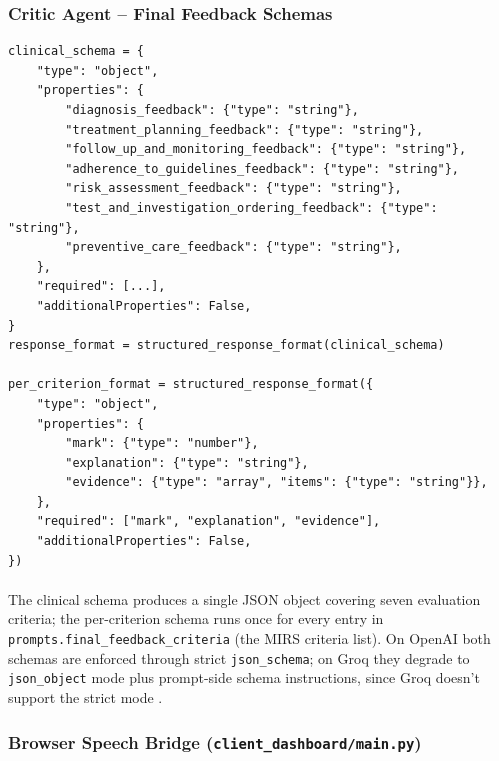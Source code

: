 \documentclass{article}
\begin{document}
\subsubsection{Critic Agent -- Final Feedback Schemas}

\begin{lstlisting}[style=codeblock]
clinical_schema = {
    "type": "object",
    "properties": {
        "diagnosis_feedback": {"type": "string"},
        "treatment_planning_feedback": {"type": "string"},
        "follow_up_and_monitoring_feedback": {"type": "string"},
        "adherence_to_guidelines_feedback": {"type": "string"},
        "risk_assessment_feedback": {"type": "string"},
        "test_and_investigation_ordering_feedback": {"type": "string"},
        "preventive_care_feedback": {"type": "string"},
    },
    "required": [...],
    "additionalProperties": False,
}
response_format = structured_response_format(clinical_schema)

per_criterion_format = structured_response_format({
    "type": "object",
    "properties": {
        "mark": {"type": "number"},
        "explanation": {"type": "string"},
        "evidence": {"type": "array", "items": {"type": "string"}},
    },
    "required": ["mark", "explanation", "evidence"],
    "additionalProperties": False,
})
\end{lstlisting}

\paragraph{}
The clinical schema produces a single JSON object covering seven evaluation criteria; the per-criterion schema runs once for every entry in \texttt{prompts.final\_feedback\_criteria} (the MIRS criteria list). On OpenAI both schemas are enforced through strict \texttt{json\_schema}; on Groq they degrade to \texttt{json\_object} mode plus prompt-side schema instructions, since Groq doesn't support the strict mode \cite{Mahajan2022TextualDQ}.

\subsubsection{Browser Speech Bridge (\texttt{client\_dashboard/main.py})}
\end{document}
